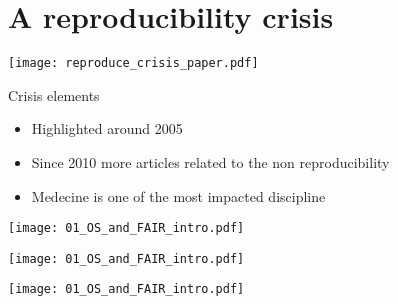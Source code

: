 \section{A reproducibility crisis}
\begin{frame}
\centering\texttt{[image: reproduce\_crisis\_paper.pdf]}
\end{frame}

\begin{frame}
\begin{block}{Crisis elements}
\begin{itemize}
\item Highlighted around 2005
\item Since 2010 more articles related to the non reproducibility
\item Medecine is one of the most impacted discipline
\end{itemize}
\end{block}
\end{frame}


\begin{frame}
\texttt{[image: 01\_OS\_and\_FAIR\_intro.pdf]}
\end{frame}

\begin{frame}
\texttt{[image: 01\_OS\_and\_FAIR\_intro.pdf]}
\end{frame}

\begin{frame}
\texttt{[image: 01\_OS\_and\_FAIR\_intro.pdf]}
\end{frame}


